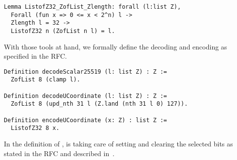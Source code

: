 \begin{lstlisting}[language=Coq]
Lemma ListofZ32_ZofList_Zlength: forall (l:list Z),
  Forall (fun x => 0 <= x < 2^n) l ->
  Zlength l = 32 ->
  ListofZ32 n (ZofList n l) = l.
\end{lstlisting}

With those tools at hand, we formally define the decoding and encoding as
specified in the RFC.

\begin{lstlisting}[language=Coq]
Definition decodeScalar25519 (l: list Z) : Z :=
  ZofList 8 (clamp l).

Definition decodeUCoordinate (l: list Z) : Z :=
  ZofList 8 (upd_nth 31 l (Z.land (nth 31 l 0) 127)).

Definition encodeUCoordinate (x: Z) : list Z :=
  ListofZ32 8 x.
\end{lstlisting}

In the definition of ,  is taking care of
setting and clearing the selected bits as stated in the RFC and described
in~.
